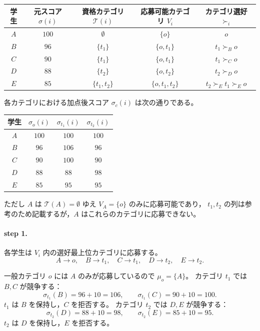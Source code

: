 \documentclass[
  12pt,
  a4paper,
  oneside,
  onecolumn,
  titlepage,
  final
]{jsarticle}
\newcommand{\1}{\mathbf{1}}
\begin{document}
\begin{center}
\begin{tabular}{c|c|c|c|c}
学生 & 元スコア $\sigma(i)$ & 資格カテゴリ $\mathcal{T}(i)$
    & 応募可能カテゴリ $V_i$ & カテゴリ選好 $\succ_i$ \\
\hline
$A$ & $100$ & $\emptyset$     & $\{o\}$        & $o$ \\
$B$ & $96$  & $\{t_1\}$      & $\{o,t_1\}$    & $t_1\succ_B o$ \\
$C$ & $90$  & $\{t_1\}$      & $\{o,t_1\}$    & $t_1\succ_C o$ \\
$D$ & $88$  & $\{t_2\}$      & $\{o,t_2\}$    & $t_2\succ_D o$ \\
$E$ & $85$  & $\{t_1,t_2\}$ & $\{o,t_1,t_2\}$ & $t_2\succ_E t_1\succ_E o$ \\
\end{tabular}
\end{center}
 
各カテゴリにおける加点後スコア $\sigma_c(i)$ は次の通りである。
 
\begin{center}
\begin{tabular}{c|c|c|c}
学生 & $\sigma_o(i)$ & $\sigma_{t_1}(i)$ & $\sigma_{t_2}(i)$ \\
\hline
$A$ & $100$ & $100$ & $100$ \\
$B$ & $96$  & $106$ & $96$  \\
$C$ & $90$  & $100$ & $90$  \\
$D$ & $88$  & $88$  & $98$  \\
$E$ & $85$  & $95$  & $95$  \\
\end{tabular}
\end{center}
 
\noindent
ただし $A$ は $\mathcal{T}(A)=\emptyset$ ゆえ $V_A=\{o\}$ のみに応募可能であり，
$t_1,t_2$ の列は参考のため記載するが，$A$ はこれらのカテゴリに応募できない。
 
\paragraph{step 1.}
各学生は $V_i$ 内の選好最上位カテゴリに応募する。
\[
    A\to o,\quad B\to t_1,\quad C\to t_1,\quad D\to t_2,\quad E\to t_2.
\]
 
一般カテゴリ $o$ には $A$ のみが応募しているので $\mu_o=\{A\}$。
カテゴリ $t_1$ では $B,C$ が競争する：
\[
    \sigma_{t_1}(B)=96+10=106,\qquad \sigma_{t_1}(C)=90+10=100.
\]
$t_1$ は $B$ を保持し，$C$ を拒否する。
カテゴリ $t_2$ では $D,E$ が競争する：
\[
    \sigma_{t_2}(D)=88+10=98,\qquad \sigma_{t_2}(E)=85+10=95.
\]
$t_2$ は $D$ を保持し，$E$ を拒否する。
 
\end{document}
